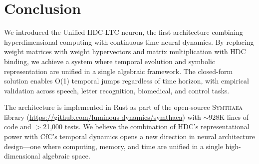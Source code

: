\documentclass{article}
\newcommand{\symthaea}{\textsc{Symthaea}}
\begin{document}
\section{Conclusion}
\label{sec:conclusion}

We introduced the Unified HDC-LTC neuron, the first architecture combining hyperdimensional computing with continuous-time neural dynamics. By replacing weight matrices with weight hypervectors and matrix multiplication with HDC binding, we achieve a system where temporal evolution and symbolic representation are unified in a single algebraic framework. The closed-form solution enables O(1) temporal jumps regardless of time horizon, with empirical validation across speech, letter recognition, biomedical, and control tasks.

The architecture is implemented in Rust as part of the open-source \symthaea{} library (\url{https://github.com/luminous-dynamics/symthaea}) with ${\sim}928$K lines of code and $>$21,000 tests. We believe the combination of HDC's representational power with CfC's temporal dynamics opens a new direction in neural architecture design---one where computing, memory, and time are unified in a single high-dimensional algebraic space.

\end{document}
